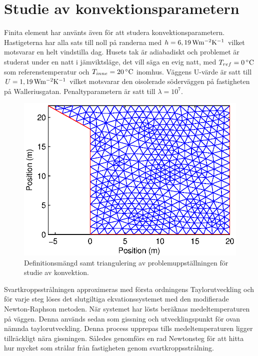 \section{Studie av konvektionsparametern}

Finita element har använts även för att studera konvektionsparametern. Hastigeterna har alla
sats till noll på randerna med $h=\unit[6,19]{Wm^{-2}K^{-1}}$ vilket motsvarar en helt vindstilla dag.
Husets tak är adiabadiskt
och problemet är studerat under en natt i jämviktsläge, det vill säga en evig natt, med
$T_{ref} = \unit[0]{^\circ C}$ som referenstemperatur och $T_{inne} = \unit[20]{^\circ C}$ inomhus.
Väggens U-värde är satt till $U = \unit[1,19]{Wm^{-2}K^{-1}}$ vilket motsvarar den oisolerade söderväggen på fastigheten på Walleriusgatan. Penaltyparametern är satt till $\lambda = 10^7$.

\begin{figure}
\centering
\includegraphics{images/triconvec.eps}
\caption{Definitionsmängd samt triangulering av problemuppställningen för studie av konvektion.}
\end{figure}

Svartkroppsstrålningen approximeras med första ordningens Taylorutveckling och
för varje steg löses det slutgiltiga ekvationssystemet med den
modifierade Newton-Raphson metoden. När systemet har lösts beräknas
medeltemperaturen på väggen. Denna används sedan som gissning och utvecklingspunkt
för ovan nämnda taylorutveckling. Denna process upprepas tills medeltemperaturen
ligger tillräckligt nära gissningen. Således genomförs en rad Newtonsteg
för att hitta hur mycket som strålar från fastigheten genom svartkroppsstrålning.


